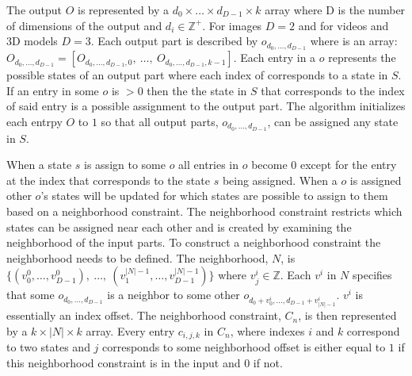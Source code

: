 \documentclass{article}
\begin{document}
The output $O$ is represented by a $d_0 \times \dots \times d_{D-1} \times k$ array where D is the number of dimensions of the output and $d_i \in \mathbb{Z}^+$. 
For images $D=2$ and for videos and 3D models $D=3$. Each output part is described by $o_{d_0, \dots, d_{D-1}}$ where is an array:
$O_{d_0, \dots, d_{D-1}} = [O_{d_0, \dots, d_{D-1}, 0}, \ \dots, \ O_{d_0, \dots, d_{D-1}, k-1}]$. Each entry in a $o$ represents the possible states of an output part
where each index of corresponds to a state in $S$. If an entry in some $o$ is $> 0$ then the the state in $S$ that corresponds to the index of said entry is a possible
assignment to the output part. The algorithm initializes each entrpy $O$ to $1$ so that all output parts, $o_{d_0, \dots, d_{D-1}}$, can be assigned any state in $S$. 

When a state $s$ is assign to some $o$ all entries in $o$ become $0$ except for the entry at the index that corresponds to the state $s$ being assigned. When a $o$ is
assigned other $o$'s states will be updated for which states are possible to assign to them based on a neighborhood constraint. The neighborhood constraint restricts which states
can be assigned near each other and is created by examining the neighborhood of the input parts. To construct a neighborhood constraint the neighborhood needs to be defined.
The neighborhood, $N$, is $\{ (v_0^0, \dots, v_{D-1}^0), \ \dots, \  (v_1^{|N|-1}, \dots, v_{D-1}^{|N|-1}) \}$ where $v_j^i \in \mathbb{Z}$. Each $v^i$ in $N$ specifies
that some $o_{d_0, \dots, d_{D-1}}$ is a neighbor to some other $o_{d_0 + v^i_0, \dots, d_{D-1} + v^i_{|N| - 1}}$. $v^i$ is essentially an index offset.
The neighborhood constraint, $C_n$, is then represented by a $k \times |N| \times k$ array. Every entry $c_{i,j,k}$ in $C_n$, where indexes $i$ and $k$
correspond to two states and $j$ corresponds to some neighborhood offset is either equal to $1$ if this neighborhood constraint is in the input and $0$ if not.
\end{document}
